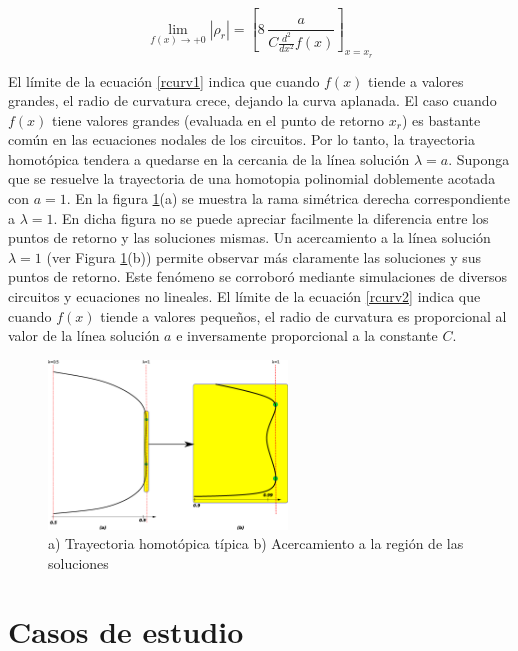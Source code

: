 \documentclass[conference,letterpaper,onecolumn]{IEEEtran}
\begin{document}
{\begin{equation}
 \displaystyle\lim_{f(x) \to{+}0}{|\rho_{r}|}= \left[8\,{\frac {a}{C{\frac {d^{2}}{d{x}^{2}}}f \left( x \right) }} \right]_{x=x_r} 
  \label{rcurv2}
\end{equation}

El l\'{i}mite de la ecuaci\'on \ref{rcurv1} indica que cuando $f(x)$ tiende a valores grandes, el radio de curvatura crece, dejando la curva aplanada.
El caso cuando $f(x)$ tiene valores grandes (evaluada en el punto de retorno $x_r$) es bastante com\'un en las ecuaciones nodales de los circuitos. Por lo tanto,
la trayectoria homot\'opica tendera a quedarse en la cercania de la l{\'i}nea soluci\'on $\lambda=a$.
Suponga que se resuelve la trayectoria de una homotopia polinomial doblemente acotada con $a=1$. 
En la figura \ref{xxx1}(a) se muestra la rama sim\'etrica derecha correspondiente a $\lambda=1$. En dicha figura no se puede
apreciar facilmente la diferencia entre los puntos de retorno y las soluciones mismas.
Un acercamiento a la l{\'i}nea soluci\'on $\lambda=1$ (ver Figura \ref{xxx1}(b))
permite observar m\'as claramente las soluciones y sus puntos de retorno. Este fen\'omeno se 
corrobor\'o mediante simulaciones de diversos circuitos y ecuaciones no lineales. 
El l\'{i}mite de la ecuaci\'on \ref{rcurv2} indica que cuando $f(x)$ tiende a valores peque\~nos, el radio de curvatura es proporcional al valor de la l{\'i}nea soluci\'on $a$
e inversamente proporcional a la constante $C$.





\begin{figure}[hbtp]
\centering
\includegraphics[width=2.5in]{figs/curvatura.eps}
\caption{a) Trayectoria homot\'opica t{\'i}pica b) Acercamiento a la regi\'on de las soluciones}
\label{xxx1}
\end{figure}

\section{Casos de estudio}

}
\end{document}
